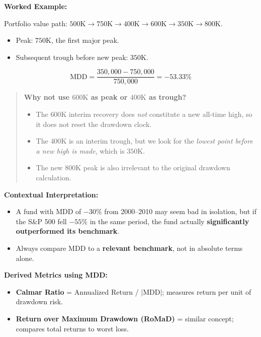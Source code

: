 \documentclass[12pt,openany]{book}
\begin{document}
\textbf{Worked Example:}

Portfolio value path: $500\text{K} \rightarrow 750\text{K} \rightarrow 400\text{K} \rightarrow 600\text{K} \rightarrow 350\text{K} \rightarrow 800\text{K}$.

\begin{itemize}[leftmargin=*]
    \item Peak: \textbf{$750\text{K}$}, the first major peak.
    \item Subsequent trough before new peak: \textbf{$350\text{K}$}.
\end{itemize}

\begin{equation*}
    \text{MDD} = \frac{350{,}000 - 750{,}000}{750{,}000} = -53.33\%
\end{equation*}

\begin{quote}
    \textbf{Why not use $600\text{K}$ as peak or $400\text{K}$ as trough?}
    \begin{itemize}[leftmargin=*]
        \item The $600\text{K}$ interim recovery does \emph{not} constitute a new all-time high, so it does not reset the drawdown clock.
        \item The $400\text{K}$ is an interim trough, but we look for the \emph{lowest point before a new high is made}, which is $350\text{K}$.
        \item The new $800\text{K}$ peak is also irrelevant to the original drawdown calculation.
    \end{itemize}
\end{quote}

\textbf{Contextual Interpretation:}
\begin{itemize}[leftmargin=*]
    \item A fund with MDD of $-30\%$ from 2000--2010 may seem bad in isolation, but if the S\&P 500 fell $-55\%$ in the same period, the fund actually \textbf{significantly outperformed its benchmark}.
    \item Always compare MDD to a \textbf{relevant benchmark}, not in absolute terms alone.
\end{itemize}

\textbf{Derived Metrics using MDD:}
\begin{itemize}[leftmargin=*]
    \item \textbf{Calmar Ratio} = Annualized Return / $|\text{MDD}|$; measures return per unit of drawdown risk.
    \item \textbf{Return over Maximum Drawdown (RoMaD)} = similar concept; compares total returns to worst loss.
\end{itemize}
\end{document}
